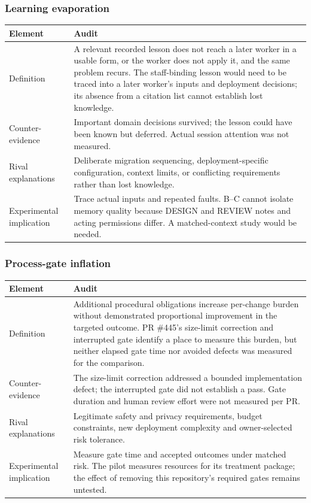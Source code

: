 \subsubsection{Learning evaporation}

{\small
\noindent
\begin{tabularx}{\textwidth}{@{}L{2.6cm}Y@{}}
\toprule
Element & Audit \\
\midrule
Definition & A relevant recorded lesson does not reach a later worker in a
usable form, or the worker does not apply it, and the same problem recurs.
The staff-binding lesson would need to
be traced into a later worker's inputs and deployment decisions;
its absence from a citation list cannot establish lost knowledge. \\
Counter-evidence & Important domain decisions survived; the lesson could have
been known but deferred. Actual session attention was not measured. \\
Rival explanations & Deliberate migration sequencing, deployment-specific
configuration, context limits, or conflicting requirements rather than lost
knowledge. \\
Experimental implication & Trace actual inputs and repeated faults. B--C
cannot isolate memory quality because DESIGN and REVIEW notes and acting
permissions differ. A matched-context study would be needed. \\
\bottomrule
\end{tabularx}
\par
}

\subsubsection{Process-gate inflation}

{\small
\noindent
\begin{tabularx}{\textwidth}{@{}L{2.6cm}Y@{}}
\toprule
Element & Audit \\
\midrule
Definition & Additional procedural obligations increase per-change burden
without demonstrated proportional improvement in the targeted outcome.
PR \#445's size-limit correction and interrupted gate identify a place
to measure this burden, but neither elapsed gate time nor avoided defects
was measured for the comparison. \\
Counter-evidence & The size-limit correction addressed a bounded implementation
defect; the interrupted gate did not establish a pass. Gate duration and human review effort were not measured per PR\@. \\
Rival explanations & Legitimate safety and privacy requirements, budget
constraints, new deployment complexity and owner-selected risk tolerance. \\
Experimental implication & Measure gate time and accepted outcomes under
matched risk. The pilot measures resources for its treatment package;
the effect of removing this repository's required gates remains untested. \\
\bottomrule
\end{tabularx}
\par
}

